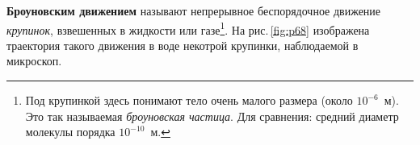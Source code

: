 \documentclass[main.tex]{subfiles}
\begin{document}
\textbf{Броуновским движением} называют непрерывное беспорядочное движение \emph{крупинок}, взвешенных в жидкости или газе\footnote{Под крупинкой здесь понимают тело очень малого размера (около $10^{-6}$~м). Это так называемая \emph{броуновская частица}. Для сравнения: средний диаметр молекулы порядка $10^{-10}$~м.}. На рис.\,\ref{fig:p68} изображена траектория такого движения в воде некотрой крупинки, наблюдаемой в микроскоп.


\begin{figure}[H]
    \centering

\end{figure}
\end{document}
